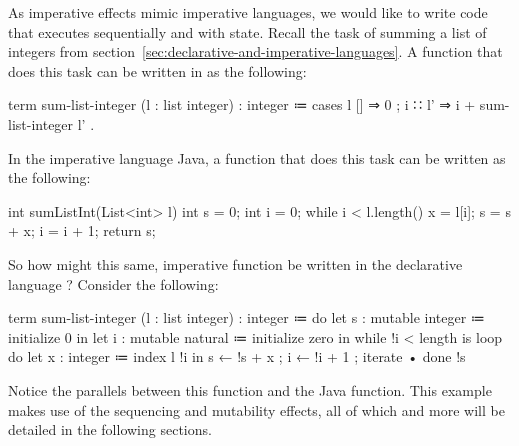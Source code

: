 As imperative effects mimic imperative languages, we would like to write code that executes sequentially and with state.
Recall the task of summing a list of integers from section~\ref{sec:declarative-and-imperative-languages}.
A function that does this task can be written in \LangA as the following:
%
\begin{snippet}[caption={Sum a list of integers (declaratively)}]
term sum-list-integer (l : list integer) : integer
  ≔ cases l
      { []     ⇒ 0
      ; i ∷ l' ⇒ i + sum-list-integer l' }.
\end{snippet}
%
In the imperative language Java,
a function that does this task can be written as the following:
%
\begin{snippet-Java}[caption={Sum a list of integers (imperatively in Java)}]
int sumListInt(List<int> l)
  {
    int s = 0;
    int i = 0;
    while i < l.length()
      {
        x = l[i];
        s = s + x;
        i = i + 1;
      }
    return s;
  }
\end{snippet-Java}
So how might this same, imperative function be written in the declarative language \LangB?
Consider the following:
\begin{snippet}[caption={Sum a list of integers (imperatively in \LangB)}]
term sum-list-integer (l : list integer) : integer
  ≔ do
      { let s : mutable integer ≔ initialize 0 in
        let i : mutable natural ≔ initialize zero in
        while !i < length is
          loop do
            { let x : integer ≔ index l !i in
              s ← !s + x
            ; i ← !i + 1
            ; iterate • }
          done !s }
\end{snippet}
Notice the parallels between this function and the Java function.
This example makes use of the sequencing and mutability effects, all of which and more will be detailed in the following sections.

